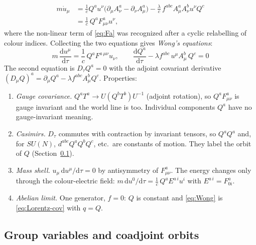 \documentclass[11pt,a4paper]{book}
\numberwithin{equation}{section}
\newcommand{\dd}{\mathrm{d}}
\theoremstyle{definition}
\theoremstyle{remark}
\begin{document}
\begin{align}
  m\dot u_\mu&=\frac1cQ^au^\nu\bigl(\partial_\mu A^a_\nu-\partial_\nu A^a_\mu\bigr)
  -\frac\lambda c\,f^{abc}A^a_\mu A^b_\nu u^\nu Q^c \nonumber\\
  &=\frac1c\,Q^aF^a_{\mu\nu}u^\nu ,
\end{align}
where the non-linear term of \eqref{eq:Fa} was recognized after a cyclic
relabelling of colour indices.  Collecting the two equations gives
\emph{Wong's equations}:
\begin{equation}
  \boxed{\ 
  m\,\frac{\dd u^\mu}{\dd\tau}=\frac1c\,Q^aF^{a\,\mu\nu}u_\nu,\qquad
  \frac{\dd Q^a}{\dd\tau}-\lambda f^{abc}\,u^\mu A^b_\mu\,Q^c=0\ }
  \label{eq:Wong}
\end{equation}
The second equation is $D_\tau Q^a=0$ with the adjoint covariant derivative
$(D_\mu Q)^a=\partial_\mu Q^a-\lambda f^{abc}A^b_\mu Q^c$.  Properties:
\begin{enumerate}[label=(\roman*),leftmargin=*]
\item \emph{Gauge covariance.}  $Q^aT^a\to U(Q^bT^b)U^{-1}$ (adjoint
  rotation), so $Q^aF^a_{\mu\nu}$ is gauge invariant and the world line is
  too.  Individual components $Q^a$ have no gauge-invariant meaning.
\item \emph{Casimirs.}  $D_\tau$ commutes with contraction by invariant
  tensors, so $Q^aQ^a$ and, for $SU(N)$, $d^{abc}Q^aQ^bQ^c$, etc.\ are
  constants of motion.  They label the orbit of $Q$ (Section~\ref{sec:orbit}).
\item \emph{Mass shell.}  $u_\mu\,\dd u^\mu/\dd\tau=0$ by antisymmetry of
  $F^a_{\mu\nu}$.  The energy changes only through the colour-electric field:
  $m\,\dd u^0/\dd\tau=\tfrac1c\,Q^aE^{a\,i}u^i$ with $E^{a\,i}=F^a_{0i}$.
\item \emph{Abelian limit.} One generator, $f=0$: $Q$ is constant and
  \eqref{eq:Wong} is \eqref{eq:Lorentz-cov} with $q=Q$.
\end{enumerate}

\subsection{Group variables and coadjoint orbits}\label{sec:orbit}
\end{document}
